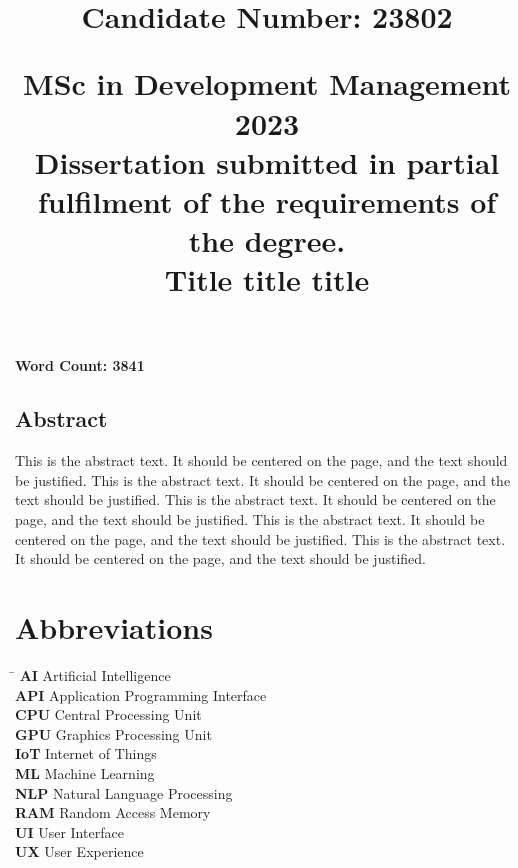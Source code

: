 \documentclass{article}%
\title{
        \begin{flushright}
        \large \textbf{Candidate Number: 23802}
        \end{flushright}
        \vspace*{30mm}
        \begin{center}
        \large MSc in Development Management 2023 \\
        \vspace*{5mm}
        Dissertation submitted in partial fulfilment of the requirements of the degree. \\
        \vspace*{35mm}
        \Huge \textbf{Title title title} \\
        \vspace*{20mm}
        \end{center}
    }%
\date{}%
\begin{document}
%
\normalsize%
%
\pagestyle{frontmatter}%
\maketitle%

\vfill
\begin{center}\textbf{Word Count: 3841}\end{center}
\newpage%
\vspace*{\fill}%
\begin{center}%
\begin{minipage}{0.8\textwidth}%
\begin{center}%
\section*{Abstract}%
\end{center}%
\justify%
This is the abstract text. It should be centered on the page, and the text should be justified. This is the abstract text. It should be centered on the page, and the text should be justified. This is the abstract text. It should be centered on the page, and the text should be justified. This is the abstract text. It should be centered on the page, and the text should be justified. This is the abstract text. It should be centered on the page, and the text should be justified. %
\end{minipage}%
\end{center}%
\vspace*{\fill}%
\newpage%
\tableofcontents%
\newpage%
\section*{Abbreviations}%
\label{sec:Abbreviations}%
\begin{tabbing}%
\hspace{3cm} \= \kill%
\textbf{AI} \> Artificial Intelligence \\%
\textbf{API} \> Application Programming Interface \\%
\textbf{CPU} \> Central Processing Unit \\%
\textbf{GPU} \> Graphics Processing Unit \\%
\textbf{IoT} \> Internet of Things \\%
\textbf{ML} \> Machine Learning \\%
\textbf{NLP} \> Natural Language Processing \\%
\textbf{RAM} \> Random Access Memory \\%
\textbf{UI} \> User Interface \\%
\textbf{UX} \> User Experience \\%
\end{tabbing}
\end{document}
